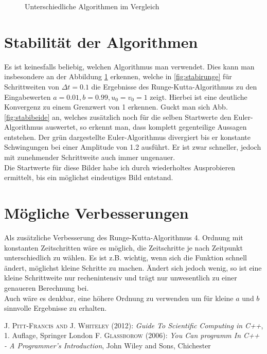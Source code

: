 \documentclass[12pt,a4paper,titlepage,headinclude,bibtotoc]{scrartcl}
\begin{document}
 \begin{figure}[h!]
  \centering
   \hfill
   \caption{Unterschiedliche Algorithmen im Vergleich}
   \label{fig:stabi}
 \end{figure}\section{Stabilität der Algorithmen}
Es ist keinesfalls beliebig, welchen Algorithmus man verwendet.
Dies kann man insbesondere an der Abbildung \ref{fig:stabi} erkennen, welche in \ref{fig:stabirunge} für Schrittweiten von $\Delta t=0.1$ die Ergebnisse des Runge-Kutta-Algorithmus zu den Eingabewerten $a=0.01, b=0.99, u_0=v_0=1$ zeigt.
Hierbei ist eine  deutliche Konvergenz zu einem  Grenzwert von 1 erkennen.
Guckt man sich Abb. \ref{fig:stabibeide} an, welches zusätzlich noch für die selben Startwerte den Euler-Algorithmus auswertet, so erkennt man, dass komplett gegenteilige Aussagen entstehen.
Der grün dargestellte Euler-Algorithmus divergiert bis er konstante Schwingungen bei einer Amplitude von 1.2 ausführt.
Er ist zwar schneller, jedoch mit zunehmender Schrittweite auch immer ungenauer.\\
Die Startwerte für diese Bilder habe ich durch wiederholtes Ausprobieren ermittelt, bis ein möglichst eindeutiges Bild entstand.


\section{Mögliche Verbesserungen}
Als zusätzliche Verbesserung des Runge-Kutta-Algorithmus 4. Ordnung mit konstanten Zeitschritten wäre es möglich, die Zeitschritte je nach Zeitpunkt unterschiedlich zu wählen.
Es ist z.B. wichtig, wenn sich die Funktion schnell ändert, möglichst kleine Schritte zu machen.
Ändert sich jedoch wenig, so ist eine kleine Schrittweite nur rechenintensiv und trägt nur unwesentlich zu einer genaueren Berechnung bei.\\
Auch wäre es denkbar, eine höhere Ordnung zu verwenden um für kleine $a$ und $b$ sinnvolle Ergebnisse zu erhalten.


\begin{thebibliography}{1000}

	\textsc{J. Pitt-Francis and J. Whiteley} (2012): \emph{Guide To Scientific Computing in C++},
	1. Auflage, Springer London
	\textsc{F. Glassborow} (2006): \emph{You Can programm In C++ - A Programmer’s Introduction},
	John Wiley and Sons, Chichester
\end{thebibliography}



 
\end{document}

